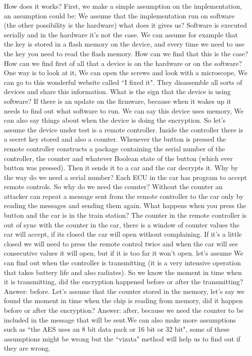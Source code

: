 How does it works? First, we make a simple assumption on the implementation, an
assumption could be: We assume that the implementation run on software (the
other possibility is the hardware) what does it gives us? Software is executed
serially and in the hardware it's not the case. We can assume for example that
the key is stored in a flash memory on the device, and every time we need to use
the key you need to read the flash memory. How can we find that this is the
case? How can we find first of all that a device is on the hardware or on the
software? One way is to look at it, We can open the screws and look with a
microscope, We can go to this wonderful website called ``I fixed it". They
disassemble all sorts of devices and share this information. What is the sign
that the device is using software? If there is an update on the firmware,
because when it wakes up it needs to find out what software to run. We can say
this device uses memory, We can also say things about when the device is doing
the encryption. So let's assume the device under test is a remote controller.
Inside the controller there is a secret key stored and also a counter. Whenever
the button is pressed the remote controller constructs a package containing the
serial number of the controller, the counter and whatever Boolean state of the
button (which ever button was pressed). Then it sends it to a car and the car
decrypts it. Why by the way do we need a serial number? Each ECU in the car has
program to accept remote controls. So why do we need the counter? Without the
counter an attacker can repeat a message sent from the remote controller to the
car only by reading the messages and sending them again. What happens when you
press the button and the car is in the train station? The counter in the remote
controller is out of sync with the counter in the car, there is a window of
counter values the car will accept, if its closed the car will open without
complaining. If it's a little closed we will need to press the remote control
twice and when the car will see consecutive values it will open, but if it is
too far it won't open. let's assume We can find out when the controller is
transmitting (it is a very intensive operation that takes battery life and also
radiates). So we know the moment in time when it is transmitting, did the
encryption happened before or after the transmitting? Answer: before. Let's
assume that the counter stored in the memory, let's say we found the moment in
time when the chip is reading from memory, did it happen before or after the
encryption? Answer: after, because we need the counter to be included in the
message that will be sent.We can also make more assumptions such as ``the AES
uses an 8 bit data pack or 16 bit or 32 bit", some of these assumptions might be
wrong but the ``vizata" method will help us to find out if they are wrong. 

